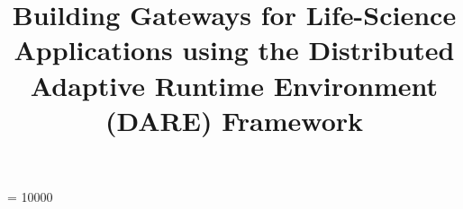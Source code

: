 \documentclass{sig-alternate}
\begin{document}
 {}
\crdata{}
\widowpenalty = 10000


\newif\ifdraft

\drafttrue                                                                                        \
\ifdraft
 \newcommand{\jkimnote}[1]{{\textcolor{green}   { ***Joohyun:   #1 }}}
 \newcommand{\jhanote}[1]{  {\textcolor{red}     { ***SJ: #1 }}}
  \newcommand{\smnote}[1]{  {\textcolor{red}     { ***Sharath: #1 }}}
 \newcommand{\todo}[1]{  {\textcolor{red}     { ***TODO: #1 }}}
 \newcommand{\fix}[1]{  {\textcolor{red}     { ***FIX: #1 }}}
 \newcommand{\reviewer}[1]{}
\else
 \newcommand{\reviewer}[1]{}
 \newcommand{\jkimnote}[1]{}
 \newcommand{\smnote}[1]{}
 \newcommand{\jhanote}[1]{}
 \newcommand{\todo}[1]{  {\textcolor{red}     { ***TODO: #1 }}}
 \newcommand{\fix}[1]{}                                                                              
 \fi


\title{Building Gateways for Life-Science Applications using the
  Distributed Adaptive Runtime Environment (DARE) Framework}

%
%
%
%
%
\end{document}
